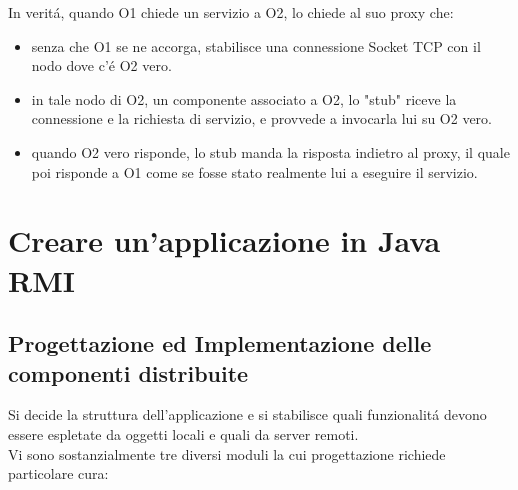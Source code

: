\documentclass[a4paper, 12 pt, italian]{report}
\begin{document}
In verit\'a, quando O1 chiede un servizio a O2, lo chiede al suo proxy che:
\begin{itemize}

\item senza che O1 se ne accorga, stabilisce una connessione Socket TCP con il nodo dove c'\'e O2 vero.

\item in tale nodo di O2, un componente associato a O2, lo "stub" riceve la connessione e la richiesta di servizio, e provvede a invocarla lui su O2 vero.

\item quando O2 vero risponde, lo stub manda la risposta indietro al proxy, il quale poi risponde a O1 come se fosse stato realmente lui a eseguire il servizio.

\end{itemize}
\newpage

\section{Creare un'applicazione in Java RMI}

\subsection{Progettazione ed Implementazione delle componenti distribuite}

Si decide la struttura dell'applicazione e si stabilisce quali funzionalit\'a devono essere espletate da oggetti locali e quali da server remoti.\\
Vi sono sostanzialmente tre diversi moduli la cui progettazione richiede particolare cura:
\end{document}
